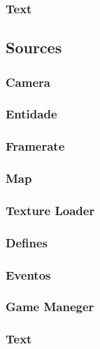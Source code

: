 \subsubsection{Text}


\subsection{Sources}\label{.cpp}

\subsubsection{Camera}

\subsubsection{Entidade}

\subsubsection{Framerate}

\subsubsection{Map}

\subsubsection{Texture Loader}

\subsubsection{Defines}

\subsubsection{Eventos}

\subsubsection{Game Maneger}

\subsubsection{Text}

